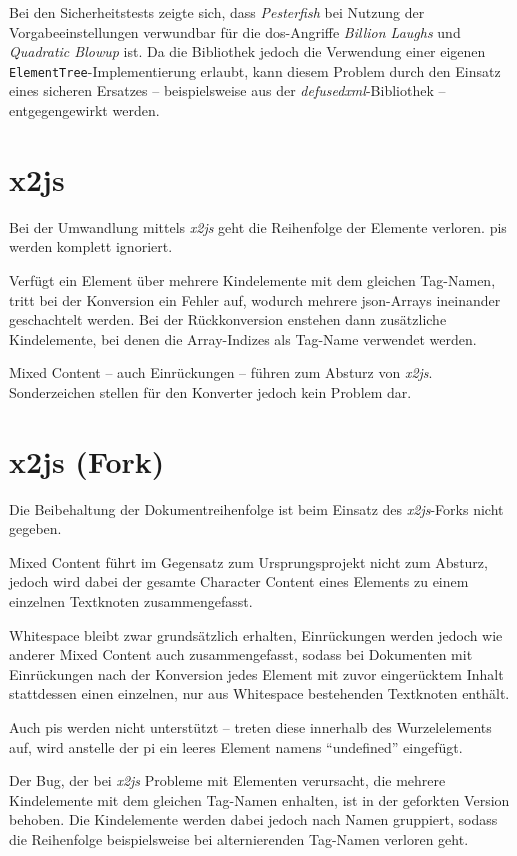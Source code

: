 Bei den Sicherheitstests zeigte sich, dass \emph{Pesterfish} bei Nutzung der Vorgabeeinstellungen verwundbar für die \acrshort{dos}-Angriffe \emph{Billion Laughs} und \emph{Quadratic Blowup} ist. Da die Bibliothek jedoch die Verwendung einer eigenen \texttt{ElementTree}-Implementierung erlaubt, kann diesem Problem durch den Einsatz eines sicheren Ersatzes -- beispielsweise aus der \emph{defusedxml}-Bibliothek -- entgegengewirkt werden.

\section{x2js}
\label{sec:x2js}

Bei der Umwandlung mittels \emph{x2js} geht die Reihenfolge der Elemente verloren. \glspl{pi} werden komplett ignoriert.

Verfügt ein Element über mehrere Kindelemente mit dem gleichen Tag-Namen, tritt bei der Konversion ein Fehler auf, wodurch mehrere \acrshort{json}-Arrays ineinander geschachtelt werden. Bei der Rückkonversion enstehen dann zusätzliche Kindelemente, bei denen die Array-Indizes als Tag-Name verwendet werden.

Mixed Content -- auch Einrückungen -- führen zum Absturz von \emph{x2js}. Sonderzeichen stellen für den Konverter jedoch kein Problem dar.

\section{x2js (Fork)}
\label{sec:x2js-fork}

Die Beibehaltung der Dokumentreihenfolge ist beim Einsatz des \emph{x2js}-Forks nicht gegeben.

Mixed Content führt im Gegensatz zum Ursprungsprojekt nicht zum Absturz, jedoch wird dabei der gesamte Character Content eines Elements zu einem einzelnen Textknoten zusammengefasst.

Whitespace bleibt zwar grundsätzlich erhalten, Einrückungen werden jedoch wie anderer Mixed Content auch zusammengefasst, sodass bei Dokumenten mit Einrückungen nach der Konversion jedes Element mit zuvor eingerücktem Inhalt stattdessen einen einzelnen, nur aus Whitespace bestehenden Textknoten enthält.

Auch \glspl{pi} werden nicht unterstützt -- treten diese innerhalb des Wurzelelements auf, wird anstelle der \gls{pi} ein leeres Element namens \enquote{undefined} eingefügt.

Der Bug, der bei \emph{x2js} Probleme mit Elementen verursacht, die mehrere Kindelemente mit dem gleichen Tag-Namen enhalten, ist in der geforkten Version behoben. Die Kindelemente werden dabei jedoch nach Namen gruppiert, sodass die Reihenfolge beispielsweise bei alternierenden Tag-Namen verloren geht.

